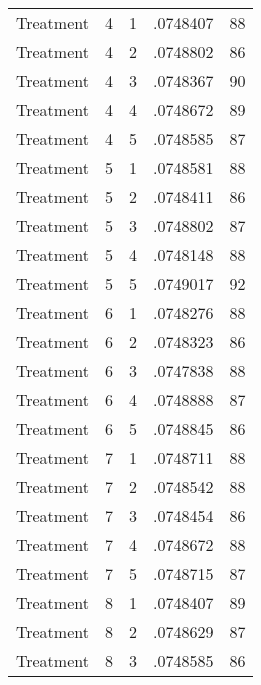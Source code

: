 \begin{tabular}{l*{4}{c}}
Treatment           &           4&           1&    .0748407&          88\\
Treatment           &           4&           2&    .0748802&          86\\
Treatment           &           4&           3&    .0748367&          90\\
Treatment           &           4&           4&    .0748672&          89\\
Treatment           &           4&           5&    .0748585&          87\\
Treatment           &           5&           1&    .0748581&          88\\
Treatment           &           5&           2&    .0748411&          86\\
Treatment           &           5&           3&    .0748802&          87\\
Treatment           &           5&           4&    .0748148&          88\\
Treatment           &           5&           5&    .0749017&          92\\
Treatment           &           6&           1&    .0748276&          88\\
Treatment           &           6&           2&    .0748323&          86\\
Treatment           &           6&           3&    .0747838&          88\\
Treatment           &           6&           4&    .0748888&          87\\
Treatment           &           6&           5&    .0748845&          86\\
Treatment           &           7&           1&    .0748711&          88\\
Treatment           &           7&           2&    .0748542&          88\\
Treatment           &           7&           3&    .0748454&          86\\
Treatment           &           7&           4&    .0748672&          88\\
Treatment           &           7&           5&    .0748715&          87\\
Treatment           &           8&           1&    .0748407&          89\\
Treatment           &           8&           2&    .0748629&          87\\
Treatment           &           8&           3&    .0748585&          86\\

\end{tabular}

